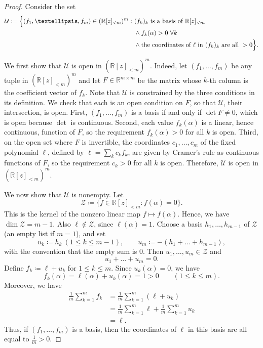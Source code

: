 \documentclass[10pt,a4paper]{amsart}
\newcommand{\PP}{\R[z]_{<m}}
\newcommand{\R}{\mathbb{R}}
\newcommand{\defas}{\coloneqq}
\begin{document}
\begin{proof}
Consider the set
\begin{align*}
\mathcal U\defas \Bigl\{(f_1,\dots,f_m)\in(\PP)^m:\ &(f_k)_k\text{ is a basis of }\PP\\
&\land f_k(\alpha)>0\ \forall k\\
&\land \text{the coordinates of }\ell\text{ in }(f_k)_k\text{ are all }>0\Bigr\}.
\end{align*}

We first show that $\mathcal U$ is open in $(\PP)^m$.
Indeed, let $(f_1,\dots,f_m)$ be any tuple in $(\PP)^m$ and let $F\in\R^{m\times m}$ be the matrix whose $k$-th column is the coefficient vector of $f_k$.
Note that $\mathcal U$ is constrained by the three conditions in its definition.
We check that each is an open condition on $F$, so that $\mathcal U$, their intersection, is open.
First, $(f_1,\dots,f_m)$ is a basis if and only if $\det F\neq0$, which is open because $\det$ is continuous.
Second, each value $f_k(\alpha)$ is a linear, hence continuous, function of $F$, so the requirement $f_k(\alpha)>0$ for all $k$ is open.
Third, on the open set where $F$ is invertible, the coordinates $c_1,\dots,c_m$ of the fixed polynomial $\ell$, defined by $\ell=\sum_kc_kf_k$, are given by Cramer's rule as continuous functions of $F$, so the requirement $c_k>0$ for all $k$ is open.
Therefore, $\mathcal U$ is open in $(\PP)^m$.

We now show that $\mathcal U$ is nonempty. Let
\[
\mathcal Z\defas \{f\in\PP:f(\alpha)=0\}.
\]
This is the kernel of the nonzero linear map $f\mapsto f(\alpha)$. Hence, we have
$\dim\mathcal Z=m-1$. Also $\ell\notin\mathcal Z$, since $\ell(\alpha)=1$.
Choose a basis $h_1,\dots,h_{m-1}$ of $\mathcal Z$ (an empty list if $m=1$), and set
\[
u_k\defas h_k\ (1\leq k\leq m-1),
\qquad
u_m\defas -(h_1+\dots+h_{m-1}),
\]
with the convention that the empty sum is $0$. Then $u_1,\dots,u_m\in\mathcal Z$ and
\[
u_1+\dots+u_m=0.
\]
Define $f_k\defas \ell+u_k$ for $1\leq k\leq m$. Since $u_k(\alpha) = 0$, we have
\[
f_k(\alpha)=\ell(\alpha)+u_k(\alpha)=1>0
\qquad(1\leq k\leq m).
\]
Moreover, we have
\begin{align*}
    \frac1m\sum_{k=1}^mf_k &= \frac1m\sum_{k=1}^m(\ell+u_k)\\
    &= \frac1m\sum_{k=1}^m\ell + \frac1m\sum_{k=1}^mu_k\\
    &= \ell .
\end{align*}
Thus, if $(f_1,\dots,f_m)$ is a basis, then the coordinates of $\ell$ in this basis are all equal to $\frac1m>0$.


\end{proof}
\end{document}
